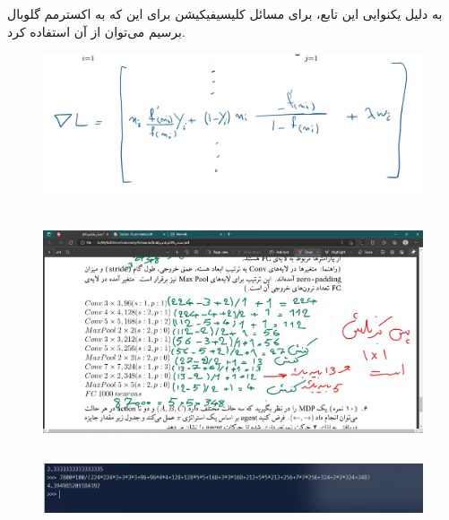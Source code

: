 \documentclass{university}
\begin{document}
\subsection{}
به دلیل یکنوایی این تابع، برای مسائل کلیسیفیکیشن برای این که به 
اکسترمم گلوبال برسیم می‌توان از آن استفاده کرد. 
\begin{figure}[H]
    \centering
    \includegraphics[width=\textwidth]{assets/4c.png}
\end{figure}

\section{}
\subsection{}
\begin{figure}[H]
    \centering
    \includegraphics[width=\textwidth]{assets/5a.png}
\end{figure}

\subsection{}
\begin{figure}[H]
    \centering
    \includegraphics[width=\textwidth]{assets/5b.png}
\end{figure}
\end{document}
